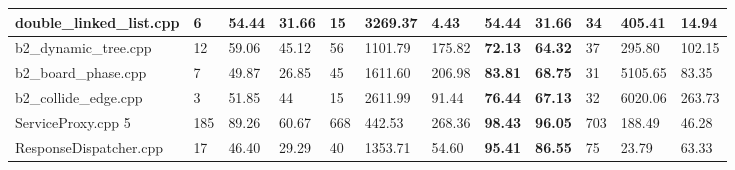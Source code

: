 \begin{table}[h]
{\begin{tabular}{|l|l|lllll|lllll|}
double\_linked\_list.cpp                             & 6                                                   & \multicolumn{1}{l|}{54.44} & \multicolumn{1}{l|}{31.66} & \multicolumn{1}{l|}{15}  & \multicolumn{1}{l|}{3269.37} & 4.43                      & \multicolumn{1}{l|}{\textbf{54.44}} & \multicolumn{1}{l|}{\textbf{31.66}} & \multicolumn{1}{l|}{34}  & \multicolumn{1}{l|}{405.41}  & 14.94                     \\ \hline
b2\_dynamic\_tree.cpp                                & 12                                                  & \multicolumn{1}{l|}{59.06} & \multicolumn{1}{l|}{45.12} & \multicolumn{1}{l|}{56}  & \multicolumn{1}{l|}{1101.79} & 175.82                    & \multicolumn{1}{l|}{\textbf{72.13}} & \multicolumn{1}{l|}{\textbf{64.32}} & \multicolumn{1}{l|}{37}  & \multicolumn{1}{l|}{295.80}  & 102.15                    \\ \hline
b2\_board\_phase.cpp                                 & 7                                                   & \multicolumn{1}{l|}{49.87} & \multicolumn{1}{l|}{26.85} & \multicolumn{1}{l|}{45}  & \multicolumn{1}{l|}{1611.60} & 206.98                    & \multicolumn{1}{l|}{\textbf{83.81}} & \multicolumn{1}{l|}{\textbf{68.75}} & \multicolumn{1}{l|}{31}  & \multicolumn{1}{l|}{5105.65} & 83.35                     \\ \hline
b2\_collide\_edge.cpp                                & 3                                                   & \multicolumn{1}{l|}{51.85} & \multicolumn{1}{l|}{44}    & \multicolumn{1}{l|}{15}  & \multicolumn{1}{l|}{2611.99} & 91.44                     & \multicolumn{1}{l|}{\textbf{76.44}} & \multicolumn{1}{l|}{\textbf{67.13}} & \multicolumn{1}{l|}{32}  & \multicolumn{1}{l|}{6020.06} & 263.73                    \\ \hline
ServiceProxy.cpp                     5                & 185                                                 & \multicolumn{1}{l|}{89.26} & \multicolumn{1}{l|}{60.67} & \multicolumn{1}{l|}{668} & \multicolumn{1}{l|}{442.53}  & 268.36                    & \multicolumn{1}{l|}{\textbf{98.43}} & \multicolumn{1}{l|}{\textbf{96.05}} & \multicolumn{1}{l|}{703} & \multicolumn{1}{l|}{188.49}  & 46.28                     \\ \hline
ResponseDispatcher.cpp                               & 17                                                  & \multicolumn{1}{l|}{46.40} & \multicolumn{1}{l|}{29.29} & \multicolumn{1}{l|}{40}  & \multicolumn{1}{l|}{1353.71} & 54.60                     & \multicolumn{1}{l|}{\textbf{95.41}} & \multicolumn{1}{l|}{\textbf{86.55}} & \multicolumn{1}{l|}{75}  & \multicolumn{1}{l|}{23.79}   & 63.33                     \\ \hline

\end{tabular}}
\end{table}
